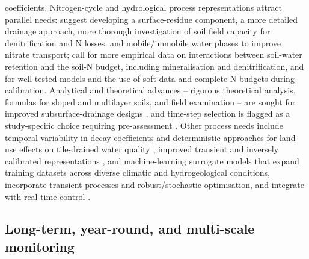 \documentclass[11pt]{article}
\begin{document}
coefficients. Nitrogen-cycle and hydrological process representations attract
parallel needs: \textcite{Malone2017} suggest developing a surface-residue
component, a more detailed drainage approach, more thorough investigation of soil
field capacity for denitrification and N losses, and mobile/immobile water phases
to improve nitrate transport; \textcite{Gillette2018} call for more empirical data
on interactions between soil-water retention and the soil-N budget, including
mineralisation and denitrification, and for well-tested models and the use of
soft data and complete N budgets during calibration. Analytical and theoretical
advances -- rigorous theoretical analysis, formulas for sloped and multilayer
soils, and field examination -- are sought for improved subsurface-drainage designs
\parencite{Tao2016,Tao2019}, and time-step selection is flagged as a
study-specific choice requiring pre-assessment \parencite{Awad2022b}. Other
process needs include temporal variability in decay coefficients and deterministic
approaches for land-use effects on tile-drained water quality \parencite{Rudra2005},
improved transient and inversely calibrated representations \parencite{Sedaghatdoost2018},
and machine-learning surrogate models that expand training datasets across diverse
climatic and hydrogeological conditions, incorporate transient processes and
robust/stochastic optimisation, and integrate with real-time control
\parencite{Lei2026}.

\subsection{Long-term, year-round, and multi-scale monitoring}
\end{document}
